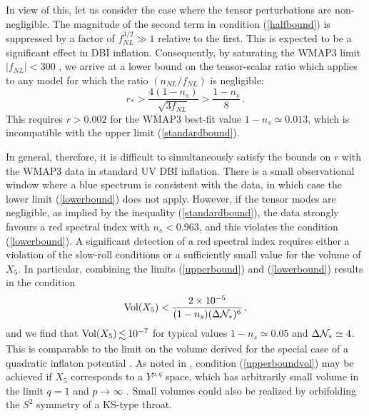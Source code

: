 In view of this, let us consider the case where the tensor 
perturbations are non-negligible. 
The magnitude of the second term in condition (\ref{halfbound}) 
is suppressed by a factor of $f_{NL}^{3/2} \gg 1$ 
relative to the first. This is expected to 
be a significant effect in DBI inflation. 
Consequently, 
by saturating the WMAP3 limit $|f_{NL}| < 300$ \cite{crim}, we arrive at 
a lower bound on the tensor-scalar ratio which applies   
to any model for which the ratio $(n_{NL}/f_{NL})$ is 
negligible:
\begin{equation}
\label{lowerbound}
r_* >  \frac{4(1-n_s)}{\sqrt{3f_{NL}}} > \frac{1-n_s}{8} \,.
\end{equation}
This requires $r > 0.002$ for the WMAP3 best-fit value 
$1-n_s \simeq 0.013$, which is incompatible with the upper limit 
(\ref{standardbound}). 

In general, therefore, it is difficult to simultaneously satisfy 
the bounds on $r$ with the WMAP3 data
in standard UV DBI inflation. There is a 
small observational window where a blue spectrum is consistent 
with the data, in which case the lower limit 
(\ref{lowerbound}) does not apply. 
However, if the tensor modes are negligible,
as implied by the inequality (\ref{standardbound}), the 
data strongly favours a red spectral index with $n_s < 0.963$,
and this violates the condition (\ref{lowerbound}). A significant 
detection of a red spectral index requires either a 
violation of the slow-roll conditions or a sufficiently 
small value for the volume of $X_5$. 
In particular, combining the limits
(\ref{upperbound}) and (\ref{lowerbound}) results in the condition 
\begin{equation}
\label{upperboundvol}
\mathrm{Vol}(X_5) < \frac{2 \times 10^{-5}}{(1-n_s) 
(\Delta {\cal{N}}_{*} )^6}  \,,
\end{equation}
and we find that $\mathrm{Vol}(X_5) \, \lsim \, 10^{-7}$ 
for typical values $1-n_s \simeq 0.05$ and 
$\Delta {\cal{N}}_* \simeq 4$. 
This 
is comparable to the limit on the volume derived for the special case of a 
quadratic inflaton potential \cite{bmpaper}.  
As noted in \cite{bmpaper,bean}, condition 
(\ref{upperboundvol}) may be achieved 
if $X_5$ corresponds to a $Y^{p,q}$ space, 
which has arbitrarily small volume in the limit  
$q =1$ and $p \rightarrow \infty$ \cite{gauntlett}. 
Small volumes could also be realized 
by orbifolding the $S^2$ symmetry of a KS-type throat. 

